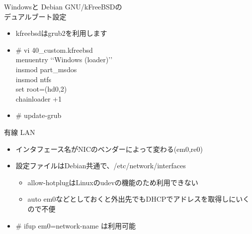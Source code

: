 

\begin{frame}[containsverbatim]{Windowsと Debian GNU/kFreeBSDの\\デュアルブート設定}
  \begin{itemize}
  \item kfreebsdはgrub2を利用します 
  \item \# vi 40\_custom.kfreebsd\\
  menuentry ‘‘Windows (loader)’’ {\\
    insmod part\_msdos\\
    insmod ntfs\\
    set root=(hd0,2)\\
    chainloader +1\\
  }
  \item \# update-grub    
  \end{itemize}
\end{frame}




\begin{frame}[containsverbatim]{有線 LAN}
  \begin{itemize}
  \item インタフェース名がNICのベンダーによって変わる(em0,re0)
  \item 設定ファイルはDebian共通で、/etc/network/interfaces
    \begin{itemize}
    \item allow-hotplugはLinuxのudevの機能のため利用できない
    \item auto em0などとしておくと外出先でもDHCPでアドレスを取得しにいくので不便
    \end{itemize}
  \item \# ifup em0={network-name} は利用可能
  \end{itemize}
\end{frame}


